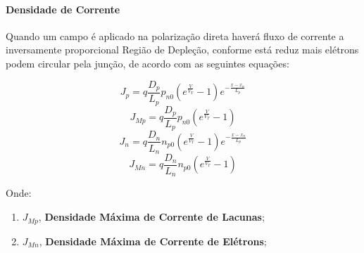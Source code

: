 \documentclass{article}
\begin{document}
            \paragraph{Densidade de Corrente}Quando um campo é aplicado na polarização direta haverá fluxo de corrente a inversamente proporcional Região de Depleção, conforme está reduz mais elétrons podem circular pela junção, de acordo com as seguintes equações:
                \begin{multicols}{2}
                    \begin{equation*}
                        J_{p} = q \frac{D_{p}}{L_{p}} p_{n0} (e^{\frac{V}{V_{T}}} - 1) e^{- \frac{x - x_{n}}{L_{p}}}
                    \end{equation*}
                    \begin{equation}
                        \boxed{
                            J_{Mp} = q \frac{D_{p}}{L_{p}} p_{n0} (e^{\frac{V}{V_{T}}} - 1)
                        }
                    \end{equation}
                    \begin{equation*}
                        J_{n} = q \frac{D_{n}}{L_{n}} n_{p0} (e^{\frac{V}{V_{T}}} - 1) e^{- \frac{x - x_{n}}{L_{p}}}
                    \end{equation*}
                    \begin{equation}
                        \boxed{
                            J_{Mn} = q \frac{D_{n}}{L_{n}} n_{p0} (e^{\frac{V}{V_{T}}} - 1)
                        }
                    \end{equation}
                \end{multicols}\noindent
            Onde:
                \begin{enumerate}[noitemsep]
                    \item $J_{Mp}$, \textbf{Densidade Máxima de Corrente de Lacunas};
                    \item $J_{Mn}$, \textbf{Densidade Máxima de Corrente de Elétrons};
                \end{enumerate}
\end{document}
